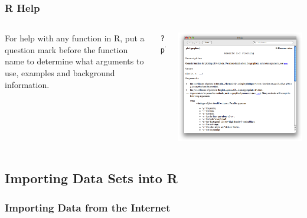 \begin{frame}[fragile]
\frametitle{R Help}

\begin{columns}
For help with any function in R, put a question mark before the function name to determine what arguments to use, examples and background information.

\begin{lstlisting}
?plot
\end{lstlisting}

\begin{center}
\includegraphics[width=1.1\textwidth]{images/help}
\end{center}
\end{columns}

\end{frame}



\subsection[Importing Data]{Importing Data Sets into R}


\subsubsection{Importing Data from the Internet}

